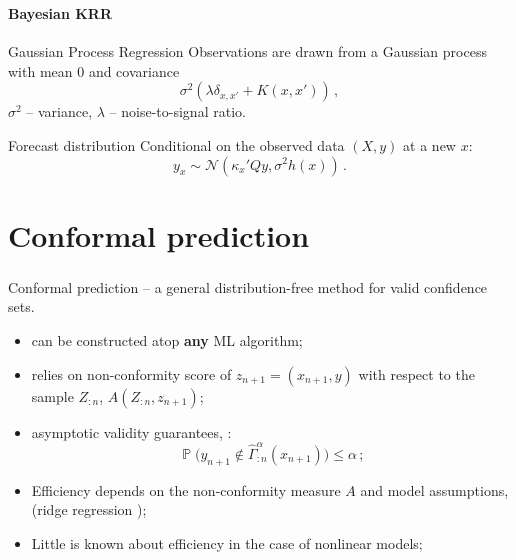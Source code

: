 \documentclass[t]{beamer}  %
\newcommand{\Ncal}{\mathcal{N}}
\newcommand{\pr}{\mathop{\mathbb{P}}\nolimits}
\begin{document}
\begin{frame}[c]\frametitle{\insertsection}
  \framesubtitle{Bayesian KRR}
  \begin{block}{Gaussian Process Regression}  
    Observations are drawn from a Gaussian process with mean $0$ and covariance
    $$ \sigma^2(\lambda\delta_{x,x'} + K(x,x')) \,,$$
    $\sigma^2$ -- variance, $\lambda$ -- noise-to-signal ratio.
  \end{block}
  \vspace{\baselineskip}
  \begin{block}{Forecast distribution}
  Conditional on the observed data $(X, y)$ at a new $x$:
  $$ y_x \sim \Ncal(\kappa_x' Q y, \sigma^2 h(x)) \,. $$
  \end{block}
\end{frame}


\section{Conformal prediction} %
\label{sec:conformal_prediction}

\begin{frame}[t]\frametitle{\insertsection}

  Conformal prediction -- a general distribution-free method for
  valid confidence sets.

  \begin{itemize}
    \item can be constructed atop \textbf{any} ML algorithm;
    \item relies on non-conformity score of $z_{n+1}=(x_{n+1}, y)$ with respect to
    the sample $Z_{:n}$, $A(Z_{:n}, z_{n+1})$;
    \item asymptotic validity guarantees, \cite{vovk2005}:
    $$ \pr\bigl( y_{n+1} \notin \hat{\Gamma}_{:n}^\alpha(x_{n+1}) \bigr) \leq \alpha \,; $$
    \item Efficiency depends on the non-conformity measure $A$ and model assumptions,
    (ridge regression \cite{burnaevV14});
    \item Little is known about efficiency in the case of nonlinear models;
  \end{itemize}
\end{frame}
\end{document}
